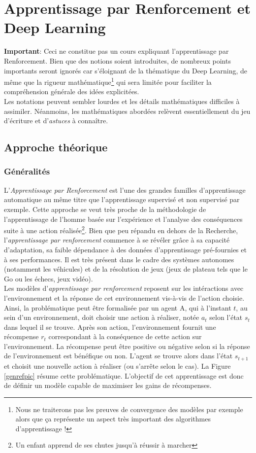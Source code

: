 \section{Apprentissage par Renforcement et Deep Learning}
\label{RL_section}

\textbf{Important}: Ceci ne constitue pas un cours expliquant l'apprentissage par Renforcement. Bien que des notions soient introduites, de nombreux points importants seront ignorés car s'éloignant de la thématique du Deep Learning, de même que la rigueur mathématique\footnote{Nous ne traiterons pas les preuves de convergence des modèles par exemple alors que ça représente un aspect très important des algorithmes d'apprentissage !} qui sera limitée pour faciliter la compréhension générale des idées explicitées.\\

\noindent Les notations peuvent sembler lourdes et les détails mathématiques difficiles à assimiler. Néanmoins, les mathématiques abordées relèvent essentiellement du jeu d'écriture et d'\textit{astuces} à connaître.

\subsection{Approche théorique}
\subsubsection{Généralités}
L'\textit{Apprentissage par Renforcement} est l'une des grandes familles d'apprentissage automatique au même titre que l'apprentissage supervisé et non supervisé par exemple. Cette approche se veut très proche de la méthodologie de l'apprentissage de l'homme basée sur l'expérience et l'analyse des conséquences suite à une action réalisée\footnote{Un enfant apprend de ses chutes jusqu'à réussir à marcher}. Bien que peu répandu en dehors de la Recherche, l'\textit{apprentissage par renforcement} commence à se révéler grâce à sa capacité d'adaptation, sa faible dépendance à des données d'apprentissage pré-fournies et à ses performances. Il est très présent dans le cadre des systèmes autonomes (notamment les véhicules) et de la résolution de jeux (jeux de plateau tels que le Go ou les échecs, jeux vidéo).\\

\noindent Les modèles d'\textit{apprentissage par renforcement} reposent sur les intéractions avec l'environnement et la réponse de cet environnement vis-à-vis de l'action choisie. Ainsi, la problématique peut être formalisée par un agent A, qui à l'instant $t$, au sein d'un environnement, doit choisir une action à réaliser, notée $a_t$ selon l'état $s_t$ dans lequel il se trouve. Après son action, l'environnement fournit une récompense $r_t$ correspondant à la conséquence de cette action sur l'environnement. La récompense peut être positive ou négative selon si la réponse de l'environnement est bénéfique ou non. L'agent se trouve alors dans l'état $s_{t+1}$ et choisit une nouvelle action à réaliser (ou s'arrête selon le cas). La Figure \ref{genrefpic} résume cette problématique. L'objectif de cet apprentissage est donc de définir un modèle capable de maximiser les gains de récompenses.

